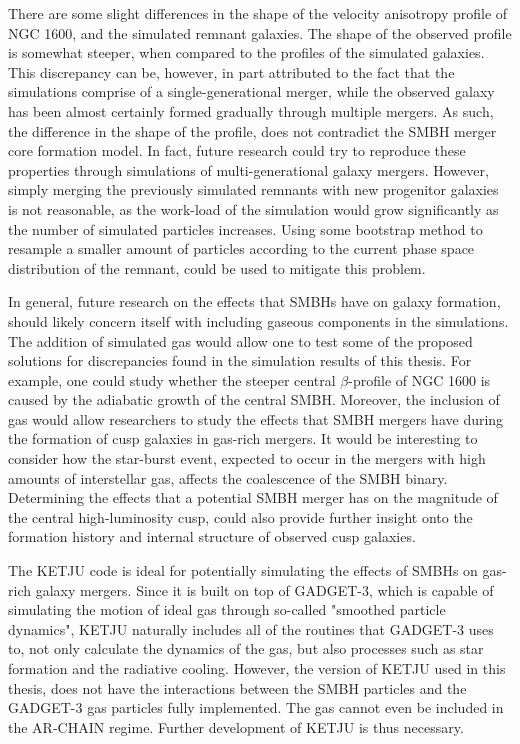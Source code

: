 \documentclass[english, twoside]{HYgradu}
\begin{document}
There are some slight differences in the shape of the velocity anisotropy profile of NGC 1600, and the simulated remnant galaxies. The shape of the observed profile is somewhat steeper, when compared to the profiles of the simulated galaxies. This discrepancy can be, however, in part attributed to the fact that the simulations comprise of a single-generational merger, while the observed galaxy has been almost certainly formed gradually through multiple mergers. As such, the difference in the shape of the profile, does not contradict the SMBH merger core formation model. In fact, future research could try to reproduce these properties through simulations of multi-generational galaxy mergers. However, simply merging the previously simulated remnants with new progenitor galaxies is not reasonable, as the work-load of the simulation would grow significantly as the number of simulated particles increases. Using some bootstrap method to resample a smaller amount of particles according to the current phase space distribution of the remnant, could be used to mitigate this problem.

In general, future research on the effects that SMBHs have on galaxy formation, should likely concern itself with including gaseous components in the simulations. The addition of simulated gas would allow one to test some of the proposed solutions for discrepancies found in the simulation results of this thesis. For example, one could study whether the steeper central $\beta$-profile of NGC 1600 is caused by the adiabatic growth of the central SMBH. Moreover, the inclusion of gas would allow researchers to study the effects that SMBH mergers have during the formation of cusp galaxies in gas-rich mergers. It would be interesting to consider how the star-burst event, expected to occur in the mergers with high amounts of interstellar gas, affects the coalescence of the SMBH binary. Determining the effects that a potential SMBH merger has on the magnitude of the central high-luminosity cusp, could also provide further insight onto the formation history and internal structure of observed cusp galaxies.

The KETJU code is ideal for potentially simulating the effects of SMBHs on gas-rich galaxy mergers. Since it is built on top of GADGET-3, which is capable of simulating the motion of ideal gas through so-called "smoothed particle dynamics", KETJU naturally includes all of the routines that GADGET-3 uses to, not only calculate the dynamics of the gas, but also processes such as star formation and the radiative cooling. However, the version of KETJU used in this thesis, does not have the interactions between the SMBH particles and the GADGET-3 gas particles fully implemented. The gas cannot even be included in the AR-CHAIN regime. Further development of KETJU is thus necessary.
\end{document}
